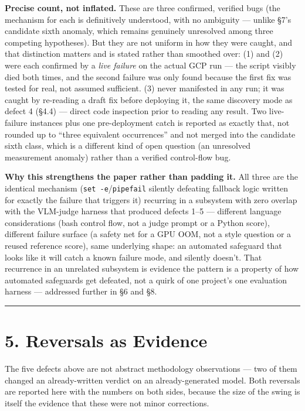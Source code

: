 \textbf{Precise count, not inflated.} These are three confirmed,
verified bugs (the mechanism for each is definitively understood, with
no ambiguity --- unlike §7's candidate sixth anomaly, which remains
genuinely unresolved among three competing hypotheses). But they are not
uniform in how they were caught, and that distinction matters and is
stated rather than smoothed over: (1) and (2) were each confirmed by a
\emph{live failure} on the actual GCP run --- the script visibly died
both times, and the second failure was only found because the first fix
was tested for real, not assumed sufficient. (3) never manifested in any
run; it was caught by re-reading a draft fix before deploying it, the
same discovery mode as defect 4 (§4.4) --- direct code inspection prior
to reading any result. Two live-failure instances plus one
pre-deployment catch is reported as exactly that, not rounded up to
``three equivalent occurrences'' and not merged into the candidate sixth
class, which is a different kind of open question (an unresolved
measurement anomaly) rather than a verified control-flow bug.

\textbf{Why this strengthens the paper rather than padding it.} All
three are the identical mechanism (\texttt{set\ -e}/\texttt{pipefail}
silently defeating fallback logic written for exactly the failure that
triggers it) recurring in a subsystem with zero overlap with the
VLM-judge harness that produced defects 1--5 --- different language
considerations (bash control flow, not a judge prompt or a Python
score), different failure surface (a safety net for a GPU OOM, not a
style question or a reused reference score), same underlying shape: an
automated safeguard that looks like it will catch a known failure mode,
and silently doesn't. That recurrence in an unrelated subsystem is
evidence the pattern is a property of how automated safeguards get
defeated, not a quirk of one project's one evaluation harness ---
addressed further in §6 and §8.

\begin{center}\rule{0.5\linewidth}{0.5pt}\end{center}

\hypertarget{reversals-as-evidence}{%
\section{5. Reversals as Evidence}\label{reversals-as-evidence}}

The five defects above are not abstract methodology observations --- two
of them changed an already-written verdict on an already-generated
model. Both reversals are reported here with the numbers on both sides,
because the size of the swing is itself the evidence that these were not
minor corrections.

